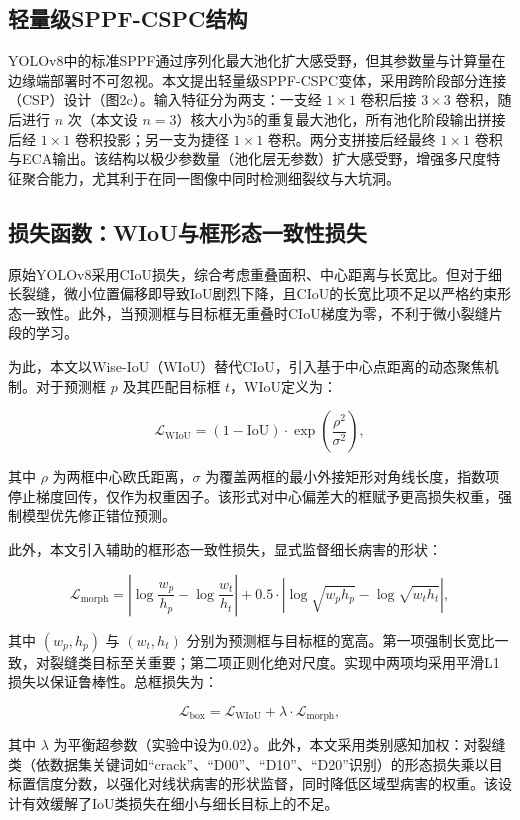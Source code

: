 \documentclass[twocolumn]{sn-jnl}
\begin{document}
	\subsection{轻量级SPPF-CSPC结构}
	YOLOv8中的标准SPPF通过序列化最大池化扩大感受野，但其参数量与计算量在边缘端部署时不可忽视。本文提出轻量级SPPF-CSPC变体，采用跨阶段部分连接（CSP）设计（图2c）。输入特征分为两支：一支经 \(1\times1\) 卷积后接 \(3\times3\) 卷积，随后进行 \(n\) 次（本文设 \(n=3\)）核大小为5的重复最大池化，所有池化阶段输出拼接后经 \(1\times1\) 卷积投影；另一支为捷径 \(1\times1\) 卷积。两分支拼接后经最终 \(1\times1\) 卷积与ECA输出。该结构以极少参数量（池化层无参数）扩大感受野，增强多尺度特征聚合能力，尤其利于在同一图像中同时检测细裂纹与大坑洞。
	
	\subsection{损失函数：WIoU与框形态一致性损失}
	原始YOLOv8采用CIoU损失，综合考虑重叠面积、中心距离与长宽比。但对于细长裂缝，微小位置偏移即导致IoU剧烈下降，且CIoU的长宽比项不足以严格约束形态一致性。此外，当预测框与目标框无重叠时CIoU梯度为零，不利于微小裂缝片段的学习。
	
	为此，本文以Wise-IoU（WIoU）替代CIoU，引入基于中心点距离的动态聚焦机制。对于预测框 \(p\) 及其匹配目标框 \(t\)，WIoU定义为：
	
	\[
	\mathcal{L}_{\text{WIoU}} = (1 - \text{IoU}) \cdot \exp\left( \frac{\rho^2}{\sigma^2} \right),
	\]
	
	其中 \(\rho\) 为两框中心欧氏距离，\(\sigma\) 为覆盖两框的最小外接矩形对角线长度，指数项停止梯度回传，仅作为权重因子。该形式对中心偏差大的框赋予更高损失权重，强制模型优先修正错位预测。
	
	此外，本文引入辅助的框形态一致性损失，显式监督细长病害的形状：
	
	\[
	\mathcal{L}_{\text{morph}} = \left| \log\frac{w_p}{h_p} - \log\frac{w_t}{h_t} \right| + 0.5 \cdot \left| \log\sqrt{w_p h_p} - \log\sqrt{w_t h_t} \right|,
	\]
	
	其中 \((w_p, h_p)\) 与 \((w_t, h_t)\) 分别为预测框与目标框的宽高。第一项强制长宽比一致，对裂缝类目标至关重要；第二项正则化绝对尺度。实现中两项均采用平滑L1损失以保证鲁棒性。总框损失为：
	
	\[
	\mathcal{L}_{\text{box}} = \mathcal{L}_{\text{WIoU}} + \lambda \cdot \mathcal{L}_{\text{morph}},
	\]
	
	其中 \(\lambda\) 为平衡超参数（实验中设为0.02）。此外，本文采用类别感知加权：对裂缝类（依数据集关键词如“crack”、“D00”、“D10”、“D20”识别）的形态损失乘以目标置信度分数，以强化对线状病害的形状监督，同时降低区域型病害的权重。该设计有效缓解了IoU类损失在细小与细长目标上的不足。
	
\end{document}
